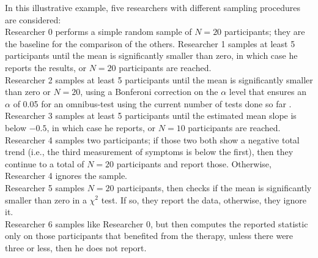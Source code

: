 \documentclass[man]{apa7}\usepackage[]{graphicx}\usepackage[]{xcolor}
\theoremstyle{definition}
\begin{document}
In this illustrative example, five researchers with different sampling procedures are considered: \\[0.1cm]  %
Researcher 0 performs a simple random sample of $N=20$ participants; they are the baseline for the comparison of the others. 
Researcher 1 samples at least 5 participants until the mean is significantly smaller than zero, in which case he reports the results, or $N=20$ participants are reached. \\
Researcher 2 samples at least 5 participants until the mean is significantly smaller than zero or $N=20$, using a Bonferoni correction on the $\alpha$ level that ensures an $\alpha$ of 0.05 for an omnibus-test using the current number of tests done so far . \\
Researcher 3 samples at least 5 participants until the estimated mean slope is below $-0.5$, in which case he reports, or $N=10$ %
participants are reached.
Researcher 4 samples two participants; if those two both show a negative total trend (i.e., the third measurement of symptoms is below the first), then they continue to a total of $N=20$ participants and report those. Otherwise, Researcher 4 ignores the sample. \\
Researcher 5 samples $N=20$ participants, then checks if the mean is significantly smaller than zero in a $\chi^2$ test. If so, they report the data, otherwise, they ignore it. \\
Researcher 6 samples like Researcher 0, but then computes the reported statistic only on those participants that benefited from the therapy, unless there were three or less, then he does not report. 

\end{document}
